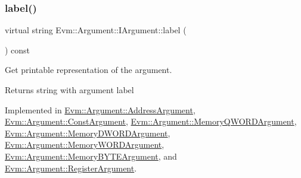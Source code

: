 \mbox{\label{struct_evm_1_1_argument_1_1_i_argument_a35bdae816e89f6f9fc393b6e03c5e521}} 
\subsubsection{\texorpdfstring{label()}{label()}}
{\footnotesize\ttfamily virtual string Evm\+::\+Argument\+::\+I\+Argument\+::label (\begin{DoxyParamCaption}{ }\end{DoxyParamCaption}) const\hspace{0.3cm}{\ttfamily [pure virtual]}}



Get printable representation of the argument. 

\begin{DoxyReturn}{Returns}
string with argument label 
\end{DoxyReturn}


Implemented in \mbox{\hyperlink{struct_evm_1_1_argument_1_1_address_argument_a4a8ca0f63e6139140f924c2cab9b3d40}{Evm\+::\+Argument\+::\+Address\+Argument}}, \mbox{\hyperlink{struct_evm_1_1_argument_1_1_const_argument_a90801800ff37e785e946f077f1c486f6}{Evm\+::\+Argument\+::\+Const\+Argument}}, \mbox{\hyperlink{struct_evm_1_1_argument_1_1_memory_q_w_o_r_d_argument_adb47000f058eca32e797c63857b4a558}{Evm\+::\+Argument\+::\+Memory\+Q\+W\+O\+R\+D\+Argument}}, \mbox{\hyperlink{struct_evm_1_1_argument_1_1_memory_d_w_o_r_d_argument_aa65e3072de44a5261193fdcfa2babc11}{Evm\+::\+Argument\+::\+Memory\+D\+W\+O\+R\+D\+Argument}}, \mbox{\hyperlink{struct_evm_1_1_argument_1_1_memory_w_o_r_d_argument_a3a719074885eb9d1329e75a2b888bd47}{Evm\+::\+Argument\+::\+Memory\+W\+O\+R\+D\+Argument}}, \mbox{\hyperlink{struct_evm_1_1_argument_1_1_memory_b_y_t_e_argument_afbe889873f7f6c825d9554e2029294b3}{Evm\+::\+Argument\+::\+Memory\+B\+Y\+T\+E\+Argument}}, and \mbox{\hyperlink{struct_evm_1_1_argument_1_1_register_argument_ab464babd0865a84e76265843c355220b}{Evm\+::\+Argument\+::\+Register\+Argument}}.

\mbox{\label{struct_evm_1_1_argument_1_1_i_argument_afcab2d2a1515518a111881a635c83da3}} 
